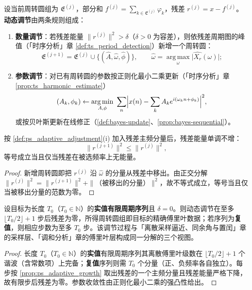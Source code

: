 \begin{definition}[周转圆组的动态调节]\label{def:ps_adaptive_adjustment}
设当前周转圆组为 $\mathfrak{E}^{(j)}$，部分和 $f^{(j)}=\sum_{k\in\mathfrak{E}^{(j)}}\varphi_k$，残差 $r^{(j)}=x-f^{(j)}$。\textbf{动态调节}由两条规则组成：
\begin{enumerate}[label=(\roman*)]
    \item \textbf{数量调节}：若残差能量 $\|r^{(j)}\|^2>\delta$（$\delta>0$ 为容差），则依残差周期图的峰值（「时序分析」章 \cref{def:ts_period_detection}）新增一个周转圆：
    \[
    \mathfrak{E}^{(j+1)}=\mathfrak{E}^{(j)}\cup\{(\hat A,\hat\omega,\hat\phi)\},\qquad
    \hat\omega=\operatorname*{arg\,max}_{\omega}\bigl|\widehat{X_{r}}(\omega)\bigr|;
    \]
    \item \textbf{参数调节}：对已有周转圆的参数按正则化最小二乘更新（「时序分析」章 \cref{prop:ts_harmonic_estimate}）
    \[
    (A_k,\phi_k)\leftarrow\operatorname*{arg\,min}_{A,\phi}\ \sum_n\Bigl|x(n)-\sum_kA_ke^{i(\omega_kn+\phi_k)}\Bigr|^2,
    \]
    或按贝叶斯更新在线修正（\cref{def:bayes-update}、\cref{prop:bayes-sequential}）。
\end{enumerate}
\end{definition}

\begin{proposition}[数量调节的单调性]\label{prop:ps_adaptive_growth}
按 \cref{def:ps_adaptive_adjustment}(i) 加入残差主频分量后，残差能量单调不增：
\[
\|r^{(j+1)}\|^2\le\|r^{(j)}\|^2,
\]
等号成立当且仅当残差在被选频率上无能量。
\end{proposition}

\begin{proof}
新增周转圆即把 $r^{(j)}$ 沿 $\hat\omega$ 的分量从残差中移出。由正交分解 $\|r^{(j)}\|^2=\|r^{(j+1)}\|^2+\|\text{（被移出的分量）}\|^2$，故不等式成立，等号当且仅当被移出分量的范数为零。
\end{proof}

\begin{theorem}[动态调节的收敛性]\label{thm:ps_adaptive_convergence}
设目标为长度 $T_0$（$T_0\in\mathbb N$）的\textbf{实值有限周期序列}且 $\delta=0$。则动态调节在至多 $\lfloor T_0/2\rfloor+1$ 步后残差为零，所得周转圆组即目标的精确傅里叶数据；若序列为\textbf{复值}，则相应步数为至多 $T_0$ 步。该调节过程与「离散采样逼近、同余角与置闰」章的采样层、「调和分析」章的傅里叶层构成同一分解的三个视图。
\end{theorem}

\begin{proof}
长度 $T_0$（$T_0\in\mathbb N$）的\textbf{实值}有限周期序列其离散傅里叶级数在 $\lfloor T_0/2\rfloor+1$ 个谐波（含常数项）上完备；\textbf{复值}序列则需 $T_0$ 个分量（正、负频率各自独立）。每步按 \cref{prop:ps_adaptive_growth} 取出残差的一个主频分量且残差能量严格下降，故有限步后残差为零。参数收敛性由正则化最小二乘的强凸性给出。
\end{proof}

